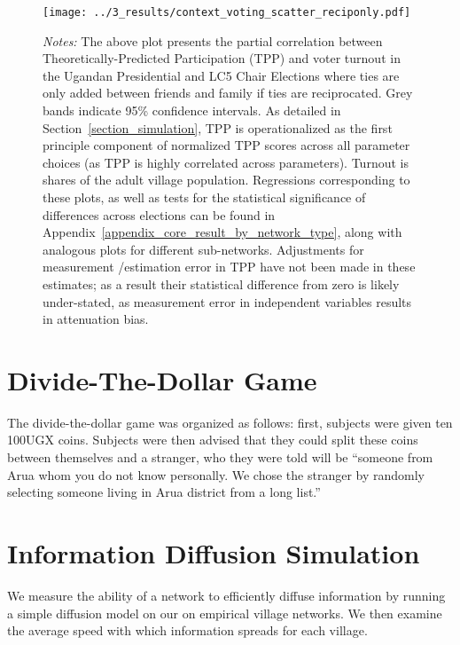 \documentclass[12pt]{article}
\begin{document}
\begin{appendix}
\begin{figure}[h!]
	\begin{center}
	    \caption{}\label{figure_context_voting_scatter_reciponly}
    		\texttt{[image: ../3\_results/context\_voting\_scatter\_reciponly.pdf]}
		\end{center}
			\scriptsize{\emph{Notes:}  The above plot presents the partial correlation between Theoretically-Predicted Participation (TPP) and voter turnout in the Ugandan Presidential and LC5 Chair Elections where ties are only added between friends and family if ties are reciprocated.  Grey bands indicate 95\% confidence intervals.  As detailed in Section~\ref{section_simulation}, TPP is operationalized as the first principle component of normalized TPP scores across all parameter choices (as TPP is highly correlated across parameters). Turnout is shares of the adult village population. Regressions corresponding to these plots, as well as tests for the statistical significance of differences across elections can be found in Appendix~\ref{appendix_core_result_by_network_type}, along with analogous plots for different sub-networks. Adjustments for measurement /estimation error in TPP have not been made in these estimates; as a result their statistical difference from zero is likely under-stated, as measurement error in independent variables results in attenuation bias.}
\end{figure}

\pagebreak
\section{Divide-The-Dollar Game}\label{appendix_divide_the_dollar}
The divide-the-dollar game was organized as follows: first, subjects were given ten 100UGX coins. Subjects were then advised that they could split these coins between themselves and a stranger, who they were told will be ``someone from Arua whom you do not know personally. We chose the stranger by randomly selecting someone living in Arua district from a long list.''




\section{Information Diffusion Simulation}\label{appendix_diffusion_model}
We measure the ability of a network to efficiently diffuse information by running a simple diffusion model on our on empirical village networks. We then examine the average speed with which information spreads for each village.


\end{appendix}
\end{document}
